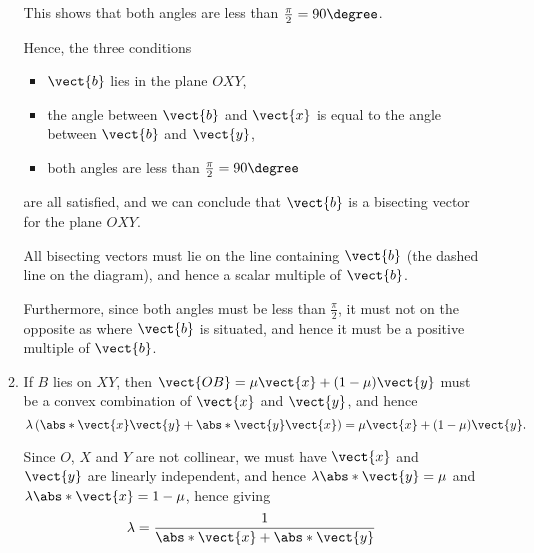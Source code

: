 \begin{enumerate}
\begin{enumerate}
                    This shows that both angles are less than \(\frac{\pi}{2} = 90\degree\).

                    Hence, the three conditions
                    \begin{itemize}
                        \item \(\vect{b}\) lies in the plane \(OXY\),
                        \item the angle between \(\vect{b}\) and \(\vect{x}\) is equal to the angle between \(\vect{b}\) and \(\vect{y}\),
                        \item both angles are less than \(\frac{\pi}{2} = 90\degree\)
                    \end{itemize}
                    are all satisfied, and we can conclude that \(\vect{b}\) is a bisecting vector for the plane \(OXY\).

                    \begin{center}
                        
                    \end{center}

                    All bisecting vectors must lie on the line containing \(\vect{b}\) (the dashed line on the diagram), and hence a scalar multiple of \(\vect{b}\).

                    Furthermore, since both angles must be less than \(\frac{\pi}{2}\), it must not on the opposite as where \(\vect{b}\) is situated, and hence it must be a positive multiple of \(\vect{b}\).

              \item If \(B\) lies on \(XY\), then \(\vect{OB} = \mu \vect{x} + (1 - \mu) \vect{y}\) must be a convex combination of \(\vect{x}\) and \(\vect{y}\), and hence
                    \[
                        \lambda\left(\abs*{\vect{x}} \vect{y} + \abs*{\vect{y}} \vect{x}\right) = \mu \vect{x} + (1 - \mu) \vect{y}.
                    \]

                    Since \(O\), \(X\) and \(Y\) are not collinear, we must have \(\vect{x}\) and \(\vect{y}\) are linearly independent, and hence \(\lambda \abs*{\vect{y}} = \mu\) and \(\lambda \abs*{\vect{x}} = 1 - \mu\), hence giving
                    \[
                        \lambda = \frac{1}{\abs*{\vect{x}} + \abs*{\vect{y}}}
                    \]


\end{enumerate}
\end{enumerate}
